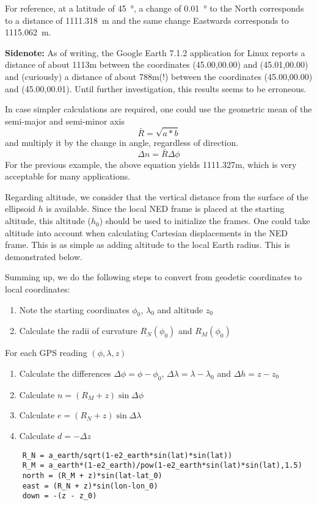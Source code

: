 For reference, at a latitude of \SI{45}{\degree}, a change of \SI{0.01}{\degree} to the North corresponds to a distance of \SI{1111.318}{\m} and the same change Eastwards corresponds to \SI{1115.062}{\m}.

\textbf{Sidenote:} As of writing, the Google Earth 7.1.2 application for Linux reports a distance of about 1113m between the coordinates (45.00,00.00) and (45.01,00.00) and (curiously) a distance of about 788m(!) between the coordinates (45.00,00.00) and (45.00,00.01). Until further investigation, this results seems to be erroneous.

In case simpler calculations are required, one could use the geometric mean of the semi-major and semi-minor axis
\begin{equation}
	\bar{R} = \sqrt{a*b}
\end{equation}
and multiply it by the change in angle, regardless of direction.
\begin{equation}
	\Delta n = \bar{R} \Delta \phi
\end{equation}
For the previous example, the above equation yields 1111.327m, which is very acceptable for many applications.


Regarding altitude, we consider that the vertical distance from the surface of the ellipsoid $h$ is available. Since the local NED frame is placed at the starting altitude, this altitude ($h_0$) should be used to initialize the frames. One could take altitude into account when calculating Cartesian displacements in the NED frame. This is as simple as adding altitude to the local Earth radius. This is demonstrated below.

Summing up, we do the following steps to convert from geodetic coordinates to local coordinates:
\begin{enumerate}
	\item Note the starting coordinates $\phi_0$, $\lambda_0$ and altitude $z_0$
	\item Calculate the radii of curvature $R_N(\phi_0)$ and $R_M(\phi_0)$
\end{enumerate}
For each GPS reading $(\phi, \lambda, z)$
\begin{enumerate}
	\item Calculate the differences $\Delta \phi = \phi - \phi_0$, $\Delta \lambda = \lambda - \lambda_0$ and $\Delta h = z - z_0$
	\item Calculate $n = (R_M + z) \sin \Delta \phi$
	\item Calculate $e = (R_N + z) \sin \Delta \lambda$
	\item Calculate $d = -\Delta z$
\end{enumerate}
%
\begin{lstlisting}
	R_N = a_earth/sqrt(1-e2_earth*sin(lat)*sin(lat))
	R_M = a_earth*(1-e2_earth)/pow(1-e2_earth*sin(lat)*sin(lat),1.5)
	north = (R_M + z)*sin(lat-lat_0)
	east = (R_N + z)*sin(lon-lon_0)
	down = -(z - z_0)
\end{lstlisting}

